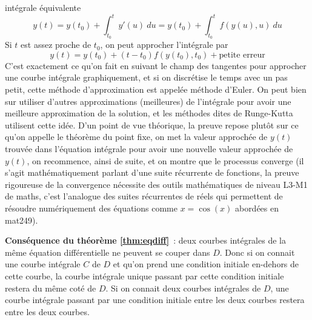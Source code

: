 \documentclass[a4paper,11pt]{book}
\begin{document}
\begin{giacjshere}
int\'egrale \'equivalente 
$$y(t)=y(t_0)+\int_{t_0}^t y'(u) \ du =
 y(t_0)+\int_{t_0}^t f(y(u),u)\ du $$ 
Si $t$ est assez proche de $t_0$, on peut approcher l'int\'egrale par 
$$ y(t) = y(t_0) + (t-t_0) f(y(t_0),t_0) + \mbox{petite erreur}$$
C'est exactement ce qu'on fait en suivant le champ des tangentes
pour approcher une courbe int\'egrale graphiquement, et si on
discr\'etise le temps avec un pas petit, cette m\'ethode
d'approximation est appel\'ee m\'ethode d'Euler. On peut
bien sur utiliser d'autres approximations (meilleures) de
l'int\'egrale pour avoir une meilleure approximation de la solution,
et les m\'ethodes dites de Runge-Kutta utilisent cette id\'ee. D'un
point de vue th\'eorique, la preuve repose plut\^ot sur ce qu'on
appelle le th\'eor\`eme du point fixe, on met la valeur approch\'ee
de $y(t)$ trouv\'ee dans l'\'equation int\'egrale pour avoir
une nouvelle valeur approch\'ee de $y(t)$, on recommence,
ainsi de suite, et on montre que
le processus converge (il s'agit math\'ematiquement parlant
d'une suite r\'ecurrente de fonctions, la preuve rigoureuse
de la convergence n\'ecessite des outils math\'ematiques 
de niveau L3-M1 de maths, c'est l'analogue des suites
r\'ecurrentes de r\'eels qui permettent de r\'esoudre
num\'eriquement des \'equations comme $x=\cos(x)$
abord\'ees en mat249).

{\bf Cons\'equence du th\'eor\`eme \ref{thm:eqdiff}}~: 
deux courbes int\'egrales de la m\^eme \'equation
diff\'erentielle ne peuvent se couper dans $D$. Donc si on connait
une courbe int\'egrale $C$ de $D$ et qu'on prend une condition initiale
en-dehors de cette courbe, la courbe int\'egrale unique passant
par cette condition initiale restera du m\^eme cot\'e de $D$. Si on
connait deux courbes int\'egrales de $D$, une courbe int\'egrale
passant par une condition initiale entre les deux courbes restera
entre les deux courbes.


\end{giacjshere}
\end{document}
